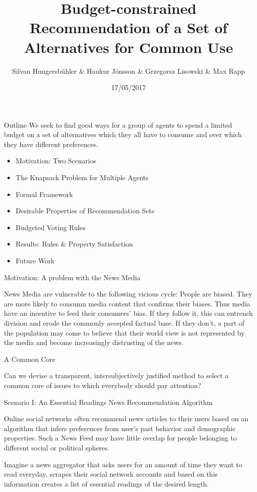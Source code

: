 \documentclass{beamer}
\title{Budget-constrained Recommendation of a Set of Alternatives for Common Use}
\author{Silvan Hungersb\"{u}hler \& Haukur J\'{o}nsson \& Grzegorsz Lisowski \& Max Rapp}
\date{17/05/2017}
\begin{document}
\begin{frame}
	\titlepage
\end{frame}

\begin{frame}{Outline}
We seek to find good ways for a group of agents to spend a limited budget on a set of alternatives which they all have to consume and over which they have different preferences. 
	\begin{itemize}
		\item Motivation: Two Scenarios
		\item The Knapsack Problem for Multiple Agents
		\item Formal Framework
		\item Desirable Properties of Recommendation Sets
		\item Budgeted Voting Rules
		\item Results: Rules \& Property Satisfaction
		\item Future Work
	\end{itemize}


\end{frame}

\begin{frame}{Motivation: A problem with the News Media}

News Media are vulnerable to the following vicious cycle: People are biased. They are more likely to consumn media content that confirms their biases. Thus media have an incentive to feed their consumers' bias. If they follow it, this can entrench division and erode the commonly accepted factual base. If they don't, a part of the population may come to believe that their world view is not represented by the media and become increasingly distrusting of the news.



\end{frame}

\begin{frame}{A Common Core}

Can we devise a transparent,  intersubjectively justified method to select a common core of issues to which everybody should pay attention?
  
	
\end{frame}
\begin{frame}{Scenario I: An Essential Readings News Recommendation Algorithm}

Online social networks often recommend news articles to their users based on an algorithm that infers preferences from user's past behavior and demographic properties. Such a News Feed may have little overlap for people belonging to different social or political spheres.


Imagine a news aggregator that asks users for an amount of time they want to read everyday, scrapes their social network accounts and based on this information creates a list of essential readings of the desired length.




  

\end{frame}
\end{document}
